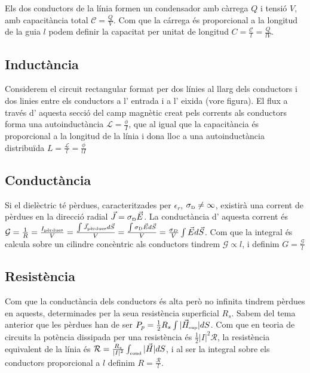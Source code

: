 Els dos conductors de la línia formen un condensador amb càrrega $Q$ i tensió $V$, amb capacitància total $\mathcal C = \frac{Q}{V}$. Com que la cárrega és proporcional a la longitud de la guia $l$ podem definir la capacitat per unitat de longitud $C = \frac{\mathcal C}{l} = \frac{Q}{l V}$.

\subsection{Inductància}

Considerem el circuit rectangular format per dos línies al llarg dels conductors i dos linies entre els conductors a l' entrada i a l' eixida (vore figura). El flux a través d' aquesta secció del camp magnètic creat pels corrents als conductors forma una autoinductància $\mathcal L = \frac{\phi}{I}$, que al igual que la capacitància és proporcional a la longitud de la línia i dona lloc a una autoinductància distribuïda $L = \frac{\mathcal L}{l} = \frac{\phi{}}{l I}$

\subsection{Conductància}

Si el dielèctric té pèrdues, caracteritzades per $\epsilon _r $, $\sigma _{\text{\tiny D}}\neq \infty$, existirà una corrent de pèrdues en la direcció radial $\vec J = \sigma _{\text{\tiny D}}\vec E$. La conductància d' aquesta corrent és $\mathcal G = \frac{1}{R} = \frac{I _{\text{\tiny pèrdues}}}{V} = \frac{\int \vec J _{\text{\tiny pèrdues}} d \vec S}{V} = \frac{\int \sigma _{\text{\tiny D}}\vec E d \vec S}{V} = \frac{\sigma _D}{V} \int \vec E d \vec S$. Com que la integral és calcula sobre un cilindre concèntric als conductors tindrem $\mathcal G \propto l$, i definim $G = \frac{\mathcal G}{l}$

\subsection{Resistència}

Com que la conductància dels conductors és alta però no infinita tindrem pèrdues en aquests, determinades per la seua resistència superficial $R_s$. Sabem del tema anterior que les pèrdues han de ser $P_p = \frac{1}{2} R_s \int \vert \vec H _{\text{\tiny sup}} \vert dS$. Com que en teoria de circuits la potència dissipada per una resistència és $\frac{1}{2} \vert I \vert ^2 \mathcal R$, la resistència equivalent de la línia és $\mathcal R = \frac{R_s}{\vert I \vert ^2} \int _{\text{\tiny cond}} \vert \vec H  \vert dS$, i al ser la integral sobre els conductors proporcional a $l$ definim $R = \frac{\mathcal R}{l}$.

